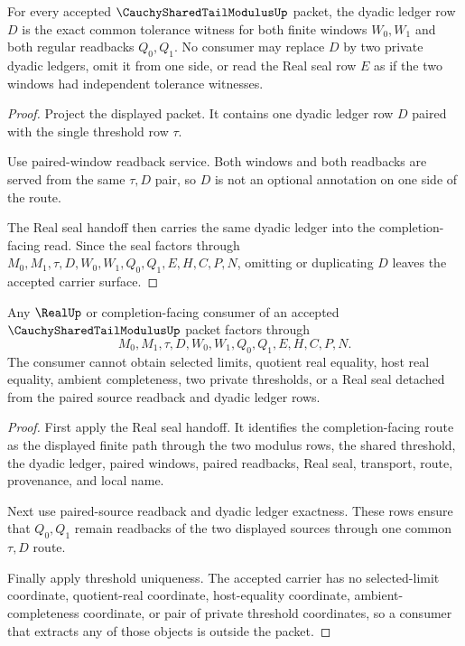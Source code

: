 \begin{theorem}
\label{thm:cauchy-shared-tail-modulus-dyadic-ledger-exactness}
For every accepted $\CauchySharedTailModulusUp$ packet, the dyadic ledger row $D$ is the exact common tolerance witness for both finite windows $W_0,W_1$ and both regular readbacks $Q_0,Q_1$. No consumer may replace $D$ by two private dyadic ledgers, omit it from one side, or read the Real seal row $E$ as if the two windows had independent tolerance witnesses.
\end{theorem}
\begin{proof}
Project the displayed packet. It contains one dyadic ledger row $D$ paired with the single threshold row $\tau$.

Use paired-window readback service. Both windows and both readbacks are served from the same $\tau,D$ pair, so $D$ is not an optional annotation on one side of the route.

The Real seal handoff then carries the same dyadic ledger into the completion-facing read. Since the seal factors through $M_0,M_1,\tau,D,W_0,W_1,Q_0,Q_1,E,H,C,P,N$, omitting or duplicating $D$ leaves the accepted carrier surface.
\end{proof}

\begin{theorem}
\label{thm:cauchy-shared-tail-modulus-completion-consumer-nonescape}
Any $\RealUp$ or completion-facing consumer of an accepted $\CauchySharedTailModulusUp$ packet factors through
$$
M_0,M_1,\tau,D,W_0,W_1,Q_0,Q_1,E,H,C,P,N.
$$
The consumer cannot obtain selected limits, quotient real equality, host real equality, ambient completeness, two private thresholds, or a Real seal detached from the paired source readback and dyadic ledger rows.
\end{theorem}
\begin{proof}
First apply the Real seal handoff. It identifies the completion-facing route as the displayed finite path through the two modulus rows, the shared threshold, the dyadic ledger, paired windows, paired readbacks, Real seal, transport, route, provenance, and local name.

Next use paired-source readback and dyadic ledger exactness. These rows ensure that $Q_0,Q_1$ remain readbacks of the two displayed sources through one common $\tau,D$ route.

Finally apply threshold uniqueness. The accepted carrier has no selected-limit coordinate, quotient-real coordinate, host-equality coordinate, ambient-completeness coordinate, or pair of private threshold coordinates, so a consumer that extracts any of those objects is outside the packet.
\end{proof}


